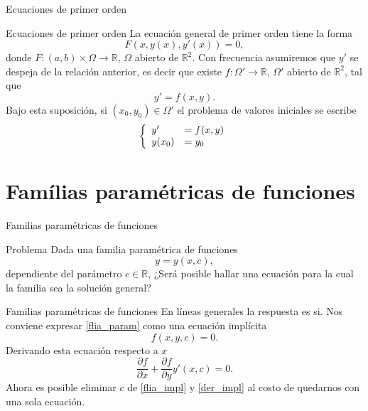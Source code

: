 \documentclass[handout,hyperref={colorlinks=true}]{beamer}
\newcommand{\rr}{\mathbb{R}}
\begin{document}
\begin{frame}{Ecuaciones de primer orden}
\begin{block}{Ecuaciones de primer orden} La ecuación general de primer orden tiene la forma
\[
F(x,y(x),y'(x))=0,
\]
donde $F:(a,b)\times \Omega\to\rr$, $\Omega$ abierto de $\rr^2$. Con frecuencia asumiremos que $y'$ se despeja de la relación anterior, es decir que existe $f:\Omega'\to\rr$,
$\Omega'$ abierto de $\rr^2$, tal que
\[y'=f(x,y).\]
Bajo esta suposición, si $(x_0,y_0)\in\Omega'$ el problema de valores iniciales se escribe
\[\left\{\begin{array}{l l}
	    y'&=f(x,y)\\
	    y(x_0)&=y_0
         \end{array}\right.
\]
\end{block}
\end{frame}


\section{Famílias paramétricas de funciones}

\begin{frame}{Familias paramétricas de funciones} 

\begin{block}{Problema}
 Dada una familia paramétrica de funciones
 \begin{equation}\label{flia_param}y=y(x,c),\end{equation}
 dependiente del parámetro $c\in\rr$, ¿Será posible hallar una ecuación para la cual la familia sea la solución general?
\end{block}
  
\end{frame}

\begin{frame}{Familias paramétricas de funciones} 
En líneas generales la respuesta es si. Nos conviene expresar \eqref{flia_param} como una ecuación implícita
\begin{equation}\label{flia_impl}f(x,y,c)=0.\end{equation}
Derivando esta ecuación respecto a $x$
\begin{equation}\label{der_impl}
 \frac{\partial f}{\partial x}+\frac{\partial f}{\partial y}y'(x,c)=0.
\end{equation}
Ahora es posible eliminar $c$ de \eqref{flia_impl} y \eqref{der_impl} al costo de quedarnos con una sola ecuación.

\end{frame}
\end{document}
